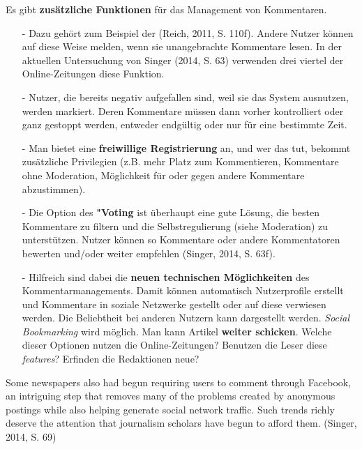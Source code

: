 Es gibt {\bf zusätzliche  Funktionen} für das Management von Kommentaren. 
\begin{itemize}
\item[-] Dazu gehört zum Beispiel der  \grqq\- (Reich, 2011, S. 110f). Andere Nutzer können auf diese Weise melden, wenn sie unangebrachte Kommentare lesen. In der aktuellen Untersuchung von Singer (2014, S. 63) verwenden drei viertel der Online-Zeitungen diese Funktion.  
\item[-] Nutzer, die bereits negativ aufgefallen sind, weil sie das System ausnutzen, werden markiert. Deren Kommentare müssen dann vorher kontrolliert oder ganz gestoppt werden, entweder endgültig oder nur für eine bestimmte Zeit. 
\item[-] Man bietet eine  {\bf freiwillige Registrierung} an, und wer das tut, bekommt zusätzliche Privilegien (z.B. mehr Platz zum Kommentieren, Kommentare ohne Moderation, Möglichkeit für oder gegen andere Kommentare abzustimmen). 
\item[-] Die Option des  {\bf "Voting\grqq} ist überhaupt eine gute Lösung, die besten Kommentare zu filtern und die Selbstregulierung (siehe Moderation) zu unterstützen. Nutzer können so Kommentare oder andere Kommentatoren bewerten und/oder weiter empfehlen (Singer, 2014, S. 63f).
 \item[-] Hilfreich sind dabei die {\bf neuen technischen Möglichkeiten} des Kommentarmanagements. Damit können automatisch Nutzerprofile erstellt und Kommentare in soziale Netzwerke gestellt oder auf diese verwiesen werden. Die Beliebtheit bei anderen Nutzern kann dargestellt werden. {\slshape Social Bookmarking} wird möglich. Man kann Artikel  {\bf weiter schicken}. Welche dieser Optionen nutzen die Online-Zeitungen? Benutzen die Leser diese {\slshape features}? Erfinden die Redaktionen neue?

\end{itemize}


Some newspapers also had begun requiring users to
comment through Facebook, an intriguing step that removes many of the problems created
by anonymous postings while also helping generate social network traffic. Such
trends richly deserve the attention that journalism scholars have begun to afford them.
(Singer, 2014, S. 69)




